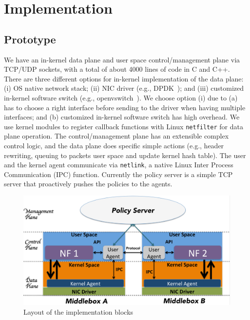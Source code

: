 \section {Implementation}

\subsection{Prototype}

We have  an in-kernel  data  plane  and user  space control/management
plane via TCP/UDP sockets, with a total of about 4000 lines of code in
C  and   C++.   There are    three  different options   for  in-kernel
implementation of the data plane: (i) OS  native  network stack; (ii) NIC
driver (e.g.,  DPDK~\cite{dpdk});   and  (iii)   customized  in-kernel
software switch (e.g.,  openvswitch~\cite{ovs}).  We choose option (i)
due to (a) \system has  to choose a  right interface before sending to
the driver   when  having  multiple  interfaces;  and  (b)  customized
in-kernel software switch has high overhead.  We use kernel modules to
register callback  functions with  Linux  \texttt{netfilter}  for data
plane operation. The   control/management  plane  has  an   extensible
complex control logic, and the data plane does specific simple actions
(e.g.,  header rewriting, queuing  to packets  user  space and  update
kernel hash table).  The user and the kernel  agent  communicate via 
\texttt{netlink}, a native   Linux  Inter Process Communication  (IPC)
function.  Currently the policy server  is   a simple TCP server  that
proactively pushes the policies to the agents.

\begin{figure}[ht]
\centering
\includegraphics[width=\linewidth]{figures/archiIllustrrate.pdf} 

\caption{\small Layout of the implementation blocks}\label{netf}
\end{figure}





